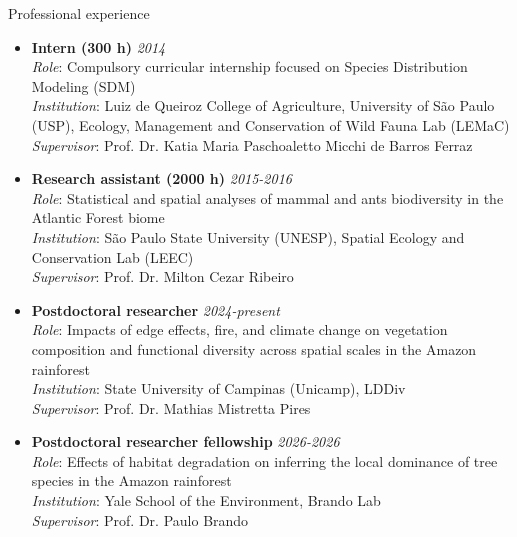\documentclass{resume}
\begin{document}
\begin{rSection}{Professional experience}
\begin{itemize}
\item \textbf{Intern (300 h)} \hfill{\em 2014}\\
\textit{Role}: Compulsory curricular internship focused on Species Distribution Modeling (SDM)\\
\textit{Institution}: Luiz de Queiroz College of Agriculture, University of São Paulo (USP), Ecology, Management and Conservation of Wild Fauna Lab (LEMaC)\\
\textit{Supervisor}: Prof. Dr. Katia Maria Paschoaletto Micchi de Barros Ferraz

\item \textbf{Research assistant (2000 h)} \hfill{\em 2015-2016}\\
\textit{Role}: Statistical and spatial analyses of mammal and ants biodiversity in the Atlantic Forest biome\\
\textit{Institution}: São Paulo State University (UNESP), Spatial Ecology and Conservation Lab (LEEC)\\
\textit{Supervisor}: Prof. Dr. Milton Cezar Ribeiro

\item \textbf{Postdoctoral researcher} \hfill{\em 2024-present}\\
\textit{Role}: Impacts of edge effects, fire, and climate change on vegetation composition and functional diversity across spatial scales in the Amazon rainforest\\
\textit{Institution}: State University of Campinas (Unicamp), LDDiv\\
\textit{Supervisor}: Prof. Dr. Mathias Mistretta Pires

\item \textbf{Postdoctoral researcher fellowship} \hfill{\em 2026-2026}\\
\textit{Role}: Effects of habitat degradation on inferring the local dominance of tree species in the Amazon rainforest\\
\textit{Institution}: Yale School of the Environment, Brando Lab\\
\textit{Supervisor}: Prof. Dr. Paulo Brando
\end{itemize}
\end{rSection}

\end{document}
